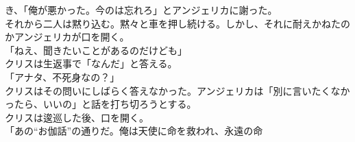 \documentclass[b5j,10pt,openany]{jsbook}
\begin{document}
き、「俺が悪かった。今のは忘れろ」とアンジェリカに謝った。\\それから二人は黙り込む。黙々と車を押し続ける。しかし、それに耐えかねたのかアンジェリカが口を開く。\\「ねえ、聞きたいことがあるのだけども」\\クリスは生返事で「なんだ」と答える。\\「アナタ、不死身なの？」\\クリスはその問いにしばらく答えなかった。アンジェリカは「別に言いたくなかったら、いいの」と話を打ち切ろうとする。\\クリスは逡巡した後、口を開く。\\「あの``お伽話''の通りだ。俺は天使に命を救われ、永遠の命
\end{document}
